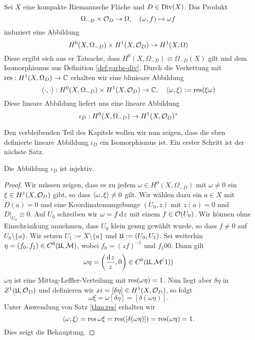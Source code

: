 \begin{defin}
  Sei $X$ eine kompakte Riemannsche Fläche und $D \in \operatorname{Div}(X)$. Das
  Produkt
  \[
  \Omega_{-D} \times \mathcal{O}_D \rightarrow \Omega, \quad (\omega, f) \mapsto
  \omega f
  \]
  induziert eine Abbildung
  \[
  H^0(X, \Omega_{-D}) \times H^1(X, \mathcal{O}_D) \rightarrow H^1(X, \Omega)
  \]
  Diese ergibt sich aus er Tatsache, dass $H^0(X, \Omega_{-D}) \equiv
  \Omega_{-D}(X)$ gilt und dem Isomorphismus aus Definition
  \ref{def:garbe-div}. Durch die Verkettung mit $\operatorname{res}: H^1(X,
  \Omega_D) \rightarrow \mathbb{C}$ erhalten wir eine blinieare Abbildung
  \[
  \langle \cdot, \cdot \rangle: H^0(X, \Omega_{-D}) \times H^1(X, \mathcal{O}_D) \rightarrow \mathbb{C},
  \quad \langle \omega, \xi \rangle := \operatorname{res}(\xi \omega)
  \]
  Diese lineare Abbildung liefert uns eine lineare Abbildung
  \[
  \iota_D : H^0(X, \Omega_{-D}) \rightarrow H^1(X, \mathcal{O}_D)^\ast
  \]
\end{defin}

Den verbleibenden Teil des Kapitels wollen wir nun zeigen, dass die
eben definierte lineare Abbildung $\iota_D$ ein Isomorphismus ist. Ein
erster Schritt ist der nächste Satz.

\begin{thm}
  \label{thm:iota-inj}
  Die Abbildung $\iota_D$ ist injektiv.
\end{thm}

\begin{proof}
  Wir müssen zeigen, dass es zu jedem $\omega \in H^0(X, \Omega_{-D})$
  mit $\omega \neq 0$ ein $\xi \in H^1(X, \mathcal{O}_D)$ gibt, so dass
  $\langle \omega, \xi \rangle \neq 0$ gilt. Wir wählen dazu ein $a \in X$ mit
  $D(a) = 0$ und eine Koordinatenumgebunge $(U_0, z)$ mit $z(a) = 0$
  und $D|_{U_0} \equiv 0$. Auf $U_0$ schreiben wir $\omega = f \d[z]$
  mit einem $f \in \mathcal{O}(U_0)$. Wir können ohne Einschränkung annehmen,
  dass $U_0$ klein genug gewählt wurde, so dass $f \neq 0$ auf $U_0
  \setminus \{a\}$. Wir setzen $U_1 := X \setminus \{a\}$ und $\mathfrak{U} :=
  (U_0, U_1)$. Sei weiterhin $\eta = (f_0, f_1) \in C^0(\mathfrak{U}, \mathcal{M})$,
  wobei $f_0 = (z f)^{-1}$ und $f_1 0 0$. Dann gilt
  \[
  \omega \eta = \left ( \frac{\d[z]}{z}, 0 \right ) \in C^0(\fu,
  \mer^(1))
  \]
  $\omega \eta$ ist eine Mittag-Leffler-Verteilung mit
  $\operatorname{res}(\omega\eta) = 1$. Nun liegt aber $\delta \eta$ in $Z^1(\mathfrak{U},
  \mathcal{O}_D)$ und definieren wir $xi = [\delta \eta] \in H^1(X,
  \mathcal{O}_D)$, so folgt
  \[
  \omega \xi = \omega [\delta \eta] = [ \delta( \omega \eta)].
  \]
  Unter Anwendung von Satz \ref{thm:res} erhalten wir
  \[
  \langle \omega, \xi \rangle = \operatorname{res}{\omega \xi} = \operatorname{res}([\delta(\omega \eta)]) =
  \operatorname{res}(\omega \eta) = 1.
  \]
  Dies zeigt die Behauptung.
\end{proof}

